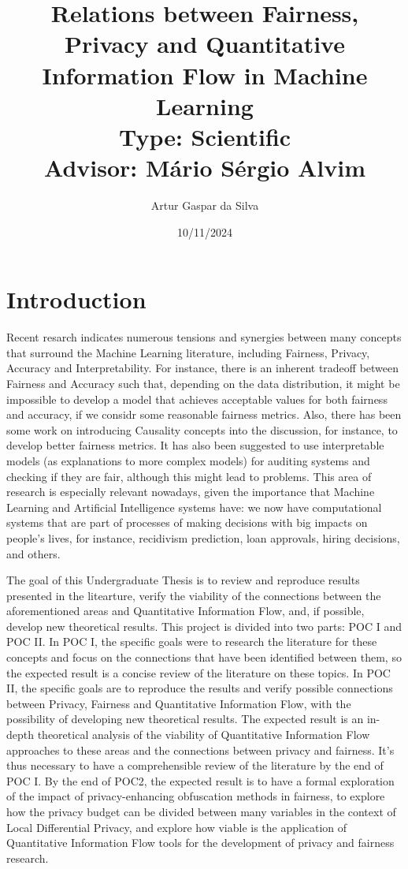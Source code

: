 \documentclass{article}
\title{Relations between Fairness, Privacy and Quantitative Information Flow in Machine Learning\large\\ Type: Scientific\\Advisor: Mário Sérgio Alvim}
\author{Artur Gaspar da Silva}
\date{10/11/2024}
\begin{document}
\maketitle

\section{Introduction}

Recent resarch\cite{Sok}\cite{Reductions}\cite{Rachel}\cite{Awareness} indicates numerous tensions and synergies between many concepts that surround the Machine Learning literature, including Fairness, Privacy, Accuracy and Interpretability. For instance, there is an inherent tradeoff between Fairness and Accuracy such that, depending on the data distribution, it might be impossible to develop a model that achieves acceptable values for both fairness and accuracy, if we considr some reasonable fairness metrics\cite{Carlos}. Also, there has been some work on introducing Causality concepts into the discussion, for instance, to develop better fairness metrics\cite{CausalFair}. It has also been suggested to use interpretable models (as explanations to more complex models) for auditing systems and checking if they are fair, although this might lead to problems\cite{ExplainAll}. This area of research is especially relevant nowadays, given the importance that Machine Learning and Artificial Intelligence systems have: we now have computational systems that are part of processes of making decisions with big impacts on people's lives, for instance, recidivism prediction\cite{Compass}, loan approvals\cite{Loans}, hiring decisions\cite{Jobs}, and others.

The goal of this Undergraduate Thesis is to review and reproduce results presented in the litearture, verify the viability of the connections between the aforementioned areas and Quantitative Information Flow, and, if possible, develop new theoretical results. This project is divided into two parts: POC I and POC II. In POC I, the specific goals were to research the literature for these concepts and focus on the connections that have been identified between them, so the expected result is a concise review of the literature on these topics. In POC II, the specific goals are to reproduce the results and verify possible connections between Privacy, Fairness and Quantitative Information Flow, with the possibility of developing new theoretical results. The expected result is an in-depth theoretical analysis of the viability of Quantitative Information Flow approaches to these areas and the connections between privacy and fairness. It's thus necessary to have a comprehensible review of the literature by the end of POC I. By the end of POC2, the expected result is to have a formal exploration of the impact of privacy-enhancing obfuscation methods in fairness, to explore how the privacy budget can be divided between many variables in the context of Local Differential Privacy, and explore how viable is the application of Quantitative Information Flow tools for the development of privacy and fairness research.
\end{document}
